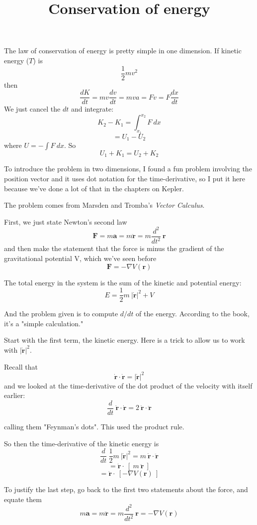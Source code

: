 \documentclass[11pt, oneside]{article}
\title{Conservation of energy}
\date{}
\begin{document}
\maketitle
\Large

The law of conservation of energy is pretty simple in one dimension.  If kinetic energy ($T$) is 
\[ \frac{1}{2} mv^2 \]
then
\[ \frac{dK}{dt} = mv \frac{dv}{dt} = mva = Fv = F \frac{dx}{dt} \]
We just cancel the $dt$ and integrate:
\[ K_{2} - K_{1}  = \int_{x_1}^{x_2} F \ dx \]
\[ = U_1 - U_2 \]
where $U = - \int F \ dx$.  So
\[ U_1 + K_1 = U_2 + K_2 \]
 
To introduce the problem in two dimensions, I found a fun problem involving  the position vector and it uses dot notation for the time-derivative, so I put it here because we've done a lot of that in the chapters on Kepler.

The problem comes from Marsden and Tromba's \emph{Vector Calculus}.

First, we just state Newton's second law
\[ \mathbf{F} = m \mathbf{a} = m \mathbf{\ddot{r}} = m \frac{d^2}{dt^2} \ \mathbf{r} \]
and then make the statement that the force is minus the gradient of the gravitational potential V, which we've seen before
\[ \mathbf{F} = - \nabla V(\mathbf{r}) \]

The total energy in the system is the sum of the kinetic and potential energy:
\[ E = \frac{1}{2} m\ |\mathbf{\dot{r}}|^2 + V \]

And the problem given is to compute $d/dt$ of the energy.  According to the book, it's a "simple calculation."

Start with the first term, the kinetic energy.  Here is a trick to allow us to work with  $|\mathbf{\dot{r}}|^2$.  

Recall that
\[ \mathbf{\dot{r}} \cdot  \mathbf{\dot{r}}  = |\mathbf{\dot{r}}|^2 \]
and we looked at the time-derivative of the dot product of the velocity with itself earlier:
\[ \frac{d}{dt} \  \mathbf{\dot{r}} \cdot  \mathbf{\dot{r}} = 2\  \mathbf{\dot{r}} \cdot  \mathbf{\ddot{r}} \]

calling them "Feynman's dots".  This used the product rule. 

So then the time-derivative of the kinetic energy is
\[ \frac{d}{dt} \ \frac{1}{2} m\ |\mathbf{\dot{r}}|^2 = m\ \mathbf{\dot{r}} \cdot  \mathbf{\ddot{r}} \]
\[ = \mathbf{\dot{r}} \cdot \ [ \ m \ \mathbf{\ddot{r}} \ ] \]
\[ = \mathbf{\dot{r}} \cdot \ [ - \nabla V(\mathbf{r}) \  ] \]

To justify the last step, go back to the first two statements about the force, and equate them
\[ m \mathbf{a} = m \mathbf{\ddot{r}} = m \frac{d^2}{dt^2} \ \mathbf{r} =  - \nabla V(\mathbf{r}) \]
\end{document}
